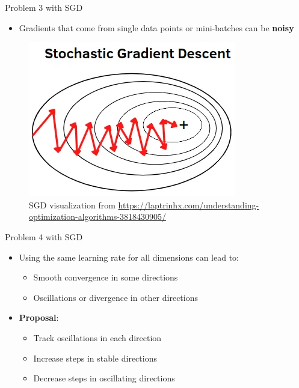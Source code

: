 \documentclass[serif, aspectratio=169]{beamer}
\begin{document}
\begin{frame}{Problem 3 with SGD}
    \begin{minipage}{0.4\textwidth}
        \begin{itemize}
        \item Gradients that come from single data points or mini-batches can be \textbf{noisy}
        \end{itemize}
    \end{minipage}%
    \begin{minipage}{0.6\textwidth}
        \centering
        \begin{figure}
            \centering
            \includegraphics[width=0.8\linewidth]{pic/sgd_mlexplained.png}
            \caption{SGD visualization from \url{https://laptrinhx.com/understanding-optimization-algorithms-3818430905/}}
        \end{figure}
    \end{minipage}
\end{frame}

\begin{frame}{Problem 4 with SGD}
    \begin{itemize}
        \item Using the same learning rate for all dimensions can lead to:
        \begin{itemize}
            \item Smooth convergence in some directions
            \item Oscillations or divergence in other directions
        \end{itemize}
        \item \textbf{Proposal}:
        \begin{itemize}
            \item Track oscillations in each direction
            \item Increase steps in stable directions
            \item Decrease steps in oscillating directions
        \end{itemize}
    \end{itemize}
\end{frame}
\end{document}
